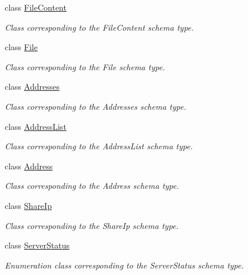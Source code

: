 \begin{DoxyCompactItemize}
class \hyperlink{classopenstack_1_1xml_1_1FileContent}{FileContent}
\begin{DoxyCompactList}\small\item\em Class corresponding to the FileContent schema type. \item\end{DoxyCompactList}\item 
class \hyperlink{classopenstack_1_1xml_1_1File}{File}
\begin{DoxyCompactList}\small\item\em Class corresponding to the File schema type. \item\end{DoxyCompactList}\item 
class \hyperlink{classopenstack_1_1xml_1_1Addresses}{Addresses}
\begin{DoxyCompactList}\small\item\em Class corresponding to the Addresses schema type. \item\end{DoxyCompactList}\item 
class \hyperlink{classopenstack_1_1xml_1_1AddressList}{AddressList}
\begin{DoxyCompactList}\small\item\em Class corresponding to the AddressList schema type. \item\end{DoxyCompactList}\item 
class \hyperlink{classopenstack_1_1xml_1_1Address}{Address}
\begin{DoxyCompactList}\small\item\em Class corresponding to the Address schema type. \item\end{DoxyCompactList}\item 
class \hyperlink{classopenstack_1_1xml_1_1ShareIp}{ShareIp}
\begin{DoxyCompactList}\small\item\em Class corresponding to the ShareIp schema type. \item\end{DoxyCompactList}\item 
class \hyperlink{classopenstack_1_1xml_1_1ServerStatus}{ServerStatus}
\begin{DoxyCompactList}\small\item\em Enumeration class corresponding to the ServerStatus schema type. \item\end{DoxyCompactList}\item 

\end{DoxyCompactItemize}
